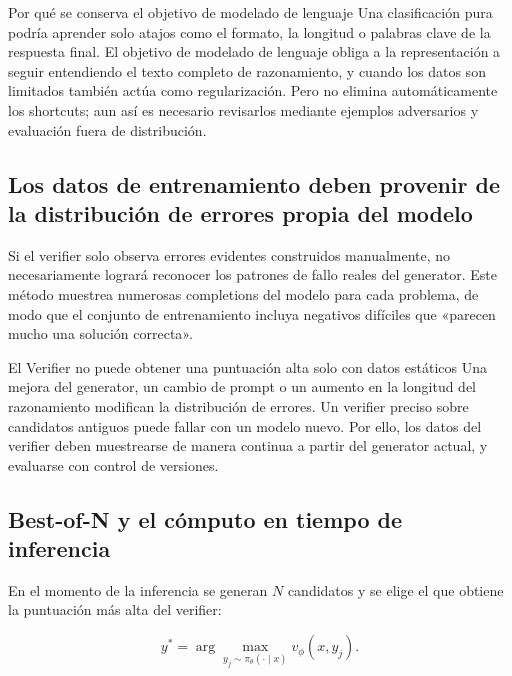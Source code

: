 
\begin{knowledgebox}{Por qué se conserva el objetivo de modelado de lenguaje}
Una clasificación pura podría aprender solo atajos como el formato, la longitud o palabras clave de la respuesta final. El objetivo de modelado de lenguaje obliga a la representación a seguir entendiendo el texto completo de razonamiento, y cuando los datos son limitados también actúa como regularización. Pero no elimina automáticamente los shortcuts; aun así es necesario revisarlos mediante ejemplos adversarios y evaluación fuera de distribución.
\end{knowledgebox}

\subsection{Los datos de entrenamiento deben provenir de la distribución de errores propia del modelo}

Si el verifier solo observa errores evidentes construidos manualmente, no necesariamente logrará reconocer los patrones de fallo reales del generator. Este método muestrea numerosas completions del modelo para cada problema, de modo que el conjunto de entrenamiento incluya negativos difíciles que «parecen mucho una solución correcta».

\begin{warningbox}{El Verifier no puede obtener una puntuación alta solo con datos estáticos}
Una mejora del generator, un cambio de prompt o un aumento en la longitud del razonamiento modifican la distribución de errores. Un verifier preciso sobre candidatos antiguos puede fallar con un modelo nuevo. Por ello, los datos del verifier deben muestrearse de manera continua a partir del generator actual, y evaluarse con control de versiones.
\end{warningbox}

\subsection{Best-of-N y el cómputo en tiempo de inferencia}

En el momento de la inferencia se generan $N$ candidatos y se elige el que obtiene la puntuación más alta del verifier:

$$
y^*=\arg\max_{y_j\sim\pi_\theta(\cdot\mid x)} v_\phi(x,y_j).
$$

